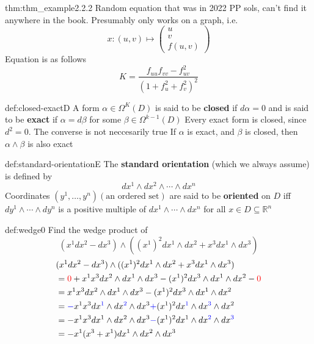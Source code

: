 \documentclass[landscape, 8pt]{extarticle}
\begin{document}
\begin{multicols}{3}
\begin{thm}{thm:thm_example}{2.2.2}
Random equation that was in 2022 PP sols, can't find it anywhere in the book. Presumably only works on a graph, i.e.
\[x : (u,v) \mapsto \begin{pmatrix}
    u \\
    v \\
    f(u,v)
\end{pmatrix}\]
Equation is as follows
\[K = \frac{f_{uu} f_{vv} - f_{uv}^{2}}{(1 + f^{2}_{u} + f^{2}_{v})^{2}}\]
\end{thm}
\vspace{-5pt}

\begin{dfn}{def:closed-exact}{D}
A form \(\alpha\in \Omega^{K}(D)\) is said to be \textbf{closed} if \(d\alpha = 0\) and is said to be \textbf{exact} if \(\alpha = d\beta\) for some \(\beta\in \Omega^{k-1}(D)\)\newline
Every exact form is closed, since \(d^{2} = 0\). The converse is not neccesarily true\newline
If \(\alpha\) is exact, and \(\beta\) is closed, then \(\alpha \wedge \beta\) is also exact

\end{dfn}

\begin{dfn}{def:standard-orientation}{E}
The \textbf{standard orientation} (which we always assume) is defined by
\[dx^{1} \wedge dx^{2}\wedge \cdots \wedge dx^{n}\]
Coordinates \((y^{1},\dots,y^{n})(\text{an ordered set})\) are said to be \textbf{oriented} on \(D\) iff \(dy^{1}\wedge \cdots \wedge dy^{n}\) is a positive multiple of \(dx^{1}\wedge \cdots \wedge dx^{n}\) for all \(x\in D \subseteq \mathbb{R}^{n}\)
\end{dfn}

\begin{xmp}{def:wedge}{0}
Find the wedge product of 
\[(x^{1}dx^{2} - dx^{3}) \wedge ((x^{1})^{2}dx^{1}\wedge dx^{2} + x^{3}dx^{1}\wedge dx^{3})\]
\begin{align*}
   &(x^{1}dx^{2} - dx^{3}) \wedge ((x^{1})^{2}dx^{1}\wedge dx^{2} + x^{3}dx^{1}\wedge dx^{3}) \\
    &= \textcolor{red}{0} + x^{1}x^{3}dx^{2}\wedge dx^{1}\wedge dx^{3} - (x^{1})^{2}dx^{3}\wedge dx^{1}\wedge dx^{2} - \textcolor{red}{0} \\
    &= x^{1}x^{3}dx^{2}\wedge dx^{1}\wedge dx^{3} - (x^{1})^{2}dx^{3}\wedge dx^{1}\wedge dx^{2} \\
    &= \textcolor{blue}{-}x^{1}x^{3}dx^{\textcolor{blue}{1}}\wedge dx^{\textcolor{blue}{2}}\wedge dx^{3} \textcolor{blue}{+} (x^{1})^{2}dx^{\textcolor{blue}{1}}\wedge dx^{\textcolor{blue}{3}}\wedge dx^{2} \\
    &= -x^{1}x^{3}dx^{1}\wedge dx^{2}\wedge dx^{3} \textcolor{blue}{-} (x^{1})^{2}dx^{1}\wedge dx^{\textcolor{blue}{2}}\wedge dx^{\textcolor{blue}{3}} \\
    &= -x^{1}(x^{3} + x^{1} )dx^{1}\wedge dx^{2}\wedge dx^{3}
\end{align*}
\end{xmp}



\end{multicols}
\end{document}
